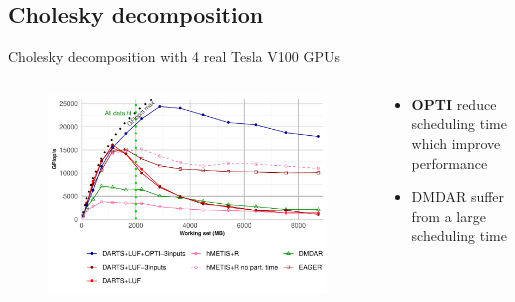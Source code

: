 \documentclass{libs/ufc_format}
\newcommand{\OPTI}{\textbf{OPTI}\xspace}
\begin{document}
\subsection{Cholesky decomposition}
\begin{frame}{Cholesky decomposition with 4 real Tesla V100 GPUs}
    \begin{columns}{}
		\begin{column}{0.7\textwidth}
		\begin{figure}
			\center\includegraphics[scale = 0.45]{Images/GF_dynamic_data_aware_no_hfp_gemini-1-fgcs_4GPU.pdf}
		\end{figure}
		\end{column}
		\begin{column}{0.3\textwidth}
		\begin{itemize}
			\item \OPTI reduce scheduling time which improve performance
			\item DMDAR suffer from a large scheduling time
		\end{itemize}
		\end{column}
	\end{columns}
\end{frame}

\end{document}

